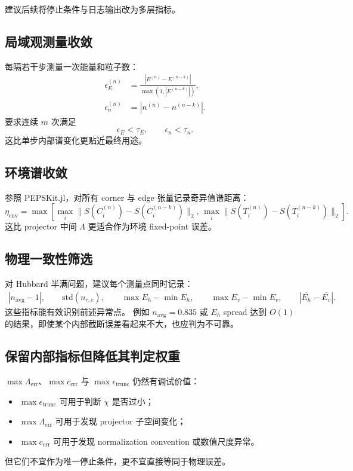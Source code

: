 \documentclass[11pt,a4paper]{ctexart}
\newcommand{\pepskit}{PEPSKit.jl}
\newcommand{\nb}{n_{\mathrm{avg}}}
\begin{document}
建议后续将停止条件与日志输出改为多层指标。

\subsection{局域观测量收敛}

每隔若干步测量一次能量和粒子数：
\begin{align}
  \epsilon_E^{(n)}
  &=
  \frac{|E^{(n)}-E^{(n-k)}|}
  {\max(1,|E^{(n-k)}|)},\\
  \epsilon_n^{(n)}
  &=
  |n^{(n)}-n^{(n-k)}|.
\end{align}
要求连续 $m$ 次满足
\begin{equation}
  \epsilon_E < \tau_E,\qquad
  \epsilon_n < \tau_n .
\end{equation}
这比单步内部谱变化更贴近最终用途。

\subsection{环境谱收敛}

参照 \pepskit{}，对所有 corner 与 edge 张量记录奇异值谱距离：
\begin{equation}
  \eta_{\mathrm{env}}
  =
  \max\left[
    \max_i \|S(C_i^{(n)})-S(C_i^{(n-k)})\|_2,\,
    \max_i \|S(T_i^{(n)})-S(T_i^{(n-k)})\|_2
  \right].
\end{equation}
这比 projector 中间 $\Lambda$ 更适合作为环境 fixed-point 误差。

\subsection{物理一致性筛选}

对 Hubbard 半满问题，建议每个测量点同时记录：
\begin{align}
  |\nb-1|,\qquad
  \mathrm{std}(n_{r,c}),\qquad
  \max E_h-\min E_h,\qquad
  \max E_v-\min E_v,\qquad
  |\overline{E_h}-\overline{E_v}|.
\end{align}
这些指标能有效识别前述异常点。
例如 $\nb=0.835$ 或 $E_h$ spread 达到 $O(1)$ 的结果，即使某个内部截断误差看起来不大，也应判为不可靠。

\subsection{保留内部指标但降低其判定权重}

$\max\Lambda_{\mathrm{err}}$、$\max c_{\mathrm{err}}$ 与 $\max\epsilon_{\mathrm{trunc}}$ 仍然有调试价值：
\begin{itemize}
  \item $\max\epsilon_{\mathrm{trunc}}$ 可用于判断 $\chi$ 是否过小；
  \item $\max\Lambda_{\mathrm{err}}$ 可用于发现 projector 子空间变化；
  \item $\max c_{\mathrm{err}}$ 可用于发现 normalization convention 或数值尺度异常。
\end{itemize}
但它们不宜作为唯一停止条件，更不宜直接等同于物理误差。
\end{document}
